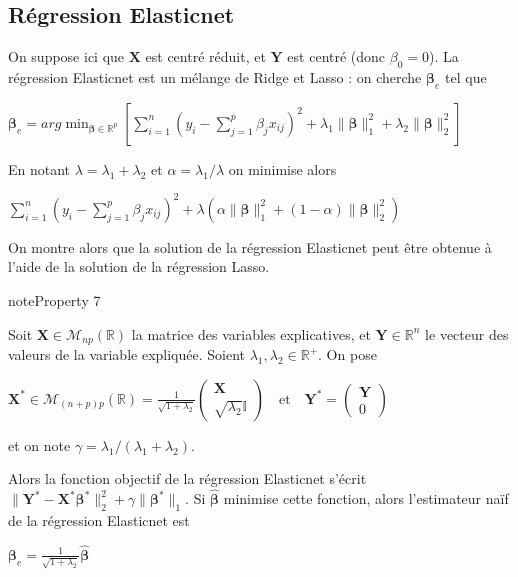 \documentclass[letterpaper,10pt,french]{sphinxmanual}
\begin{document}
\subsection{Régression Elasticnet}
\label{\detokenize{regression:regression-elasticnet}}
\ignorespaces 
{}\ignorespaces 
\sphinxAtStartPar
On suppose ici que \(\mathbf X\) est centré réduit, et \(\mathbf Y\) est centré (donc \(\beta_0=0\)). La régression Elasticnet est un mélange de Ridge et Lasso : on cherche \(\boldsymbol\beta_e\) tel que

\sphinxAtStartPar
\(\boldsymbol\beta_e = arg\displaystyle\min_{\boldsymbol\beta\in\mathbb{R}^{p}}\left [\displaystyle\sum_{i=1}^n \left (y_i-\displaystyle\sum_{j=1}^p \beta_j x_{ij}\right )^2+\lambda_1 \| \boldsymbol\beta\|^2_1 + \lambda_2 \| \boldsymbol\beta\|^2_2\right ]\)

\sphinxAtStartPar
En notant \(\lambda =\lambda_1+\lambda_2\) et \( \alpha = \lambda_1/\lambda\) on minimise alors

\sphinxAtStartPar
\(\displaystyle\sum_{i=1}^n \left (y_i-\displaystyle\sum_{j=1}^p \beta_j x_{ij}\right )^2+\lambda(\alpha \| \boldsymbol\beta\|^2_1 + (1-\alpha) \| \boldsymbol\beta\|^2_2)\)

\sphinxAtStartPar
On montre alors que la solution de la régression Elasticnet peut être obtenue à l’aide de la solution de la régression Lasso.
\label{regression:property-5}
\begin{sphinxadmonition}{note}{Property 7}



\sphinxAtStartPar
Soit \(\mathbf X\in\mathcal{M}_{np}(\mathbb R)\) la matrice des variables explicatives, et \(\mathbf Y\in\mathbb{R}^n\) le vecteur des valeurs de la variable expliquée. Soient \(\lambda_1,\lambda_2\in\mathbb{R}^+\). On pose

\sphinxAtStartPar
\(\mathbf X^*\in\mathcal{M}_{(n+p)p}(\mathbb R) = \frac{1}{\sqrt{1+\lambda_2}}\begin{pmatrix}\mathbf X\\\sqrt{\lambda_2 }\mathbb{I}\end{pmatrix}\quad\text{et}\quad \mathbf Y^*=\begin{pmatrix}\mathbf Y\\0\end{pmatrix}\)

\sphinxAtStartPar
et on note \(\gamma=\lambda_1/(\lambda_1+\lambda_2)\).

\sphinxAtStartPar
Alors la fonction objectif de la régression Elasticnet s’écrit \(\|\mathbf Y^*-\mathbf X^*\boldsymbol\beta^*\|_2^2+\gamma\|\boldsymbol\beta^*\|_1\).
Si \(\hat{\boldsymbol\beta}\) minimise cette fonction, alors l’estimateur naïf de la régression Elasticnet est

\sphinxAtStartPar
\(\boldsymbol\beta_e = \frac{1}{\sqrt{1+\lambda_2}}\hat{\boldsymbol\beta}\)
\end{sphinxadmonition}
\end{document}
